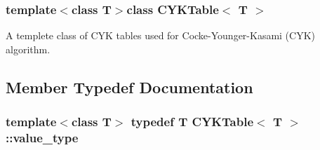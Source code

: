 \subsubsection*{template$<$class T$>$class C\+Y\+K\+Table$<$ T $>$}

A templete class of C\+Y\+K tables used for Cocke-\/\+Younger-\/\+Kasami (C\+Y\+K) algorithm. 

\subsection{Member Typedef Documentation}
\hypertarget{class_c_y_k_table_af0e11c1238d77d508d04eca433b25393}{
\subsubsection[{value\+\_\+type}]{\setlength{\rightskip}{0pt plus 5cm}template$<$class T$>$ typedef T {\bf C\+Y\+K\+Table}$<$ T $>$\+::{\bf value\+\_\+type}}}\label{class_c_y_k_table_af0e11c1238d77d508d04eca433b25393}


